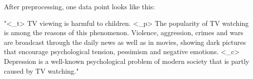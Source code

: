 After preprocessing, one data point looks like this:
\begin{center}
\raggedright
"<\_t> TV viewing is harmful to children. <\_p> The popularity of TV watching is among the reasons of this phenomenon. Violence, aggression, crimes and wars are broadcast through the daily news as well as in movies, showing dark pictures that encourage psychological tension, pessimism and negative emotions. <\_c> Depression is a well-known psychological problem of modern society that is partly caused by TV watching."
\end{center}